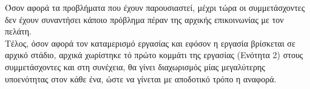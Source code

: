 \noindent
Όσον αφορά τα προβλήματα που έχουν παρουσιαστεί, μέχρι τώρα οι συμμετάσχοντες δεν έχουν συναντήσει κάποιο πρόβλημα πέραν της αρχικής επικοινωνίας με τον πελάτη.\\

\noindent
Τέλος, όσον αφορά τον καταμερισμό εργασίας και εφόσον η εργασία βρίσκεται σε αρχικό στάδιο, αρχικά χωρίστηκε τό πρώτο κομμάτι της εργασίας (Ενότητα 2) στους συμμετάσχοντες και στη συνέχεια, θα γίνει διαχωρισμός μίας μεγαλύτερης υποενότητας στον κάθε ένα, ώστε να γίνεται με αποδοτικό τρόπο η αναφορά.